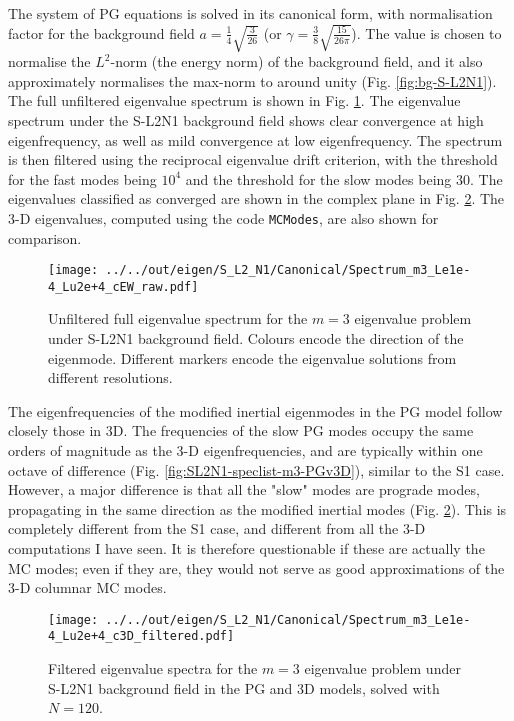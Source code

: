 The system of PG equations is solved in its canonical form, with normalisation factor for the background field $a = \frac{1}{4} \sqrt{\frac{3}{26}}$ (or $\gamma = \frac{3}{8} \sqrt{\frac{15}{26\pi}}$). The value is chosen to normalise the $L^2$-norm (the energy norm) of the background field, and it also approximately normalises the max-norm to around unity (Fig. \ref{fig:bg-S-L2N1}). The full unfiltered eigenvalue spectrum is shown in Fig. \ref{fig:SL2N1-spectrum-m3}. 
The eigenvalue spectrum under the S-L2N1 background field shows clear convergence at high eigenfrequency, as well as mild convergence at low eigenfrequency. The spectrum is then filtered using the reciprocal eigenvalue drift criterion, with the threshold for the fast modes being $10^4$ and the threshold for the slow modes being $30$. The eigenvalues classified as converged are shown in the complex plane in Fig. \ref{fig:SL2N1-spectrum-m3-PGv3D}. The 3-D eigenvalues, computed using the code \colorbox{backcolour}{\lstinline{MCModes}}, are also shown for comparison. 
%
\begin{figure}[htbp]
    \centering
    \texttt{[image: ../../out/eigen/S\_L2\_N1/Canonical/Spectrum\_m3\_Le1e-4\_Lu2e+4\_cEW\_raw.pdf]}
    \caption{Unfiltered full eigenvalue spectrum for the $m=3$ eigenvalue problem under S-L2N1 background field. Colours encode the direction of the eigenmode. Different markers encode the eigenvalue solutions from different resolutions.}
    \label{fig:SL2N1-spectrum-m3}
\end{figure}
%
The eigenfrequencies of the modified inertial eigenmodes in the PG model follow closely those in 3D. The frequencies of the slow PG modes occupy the same orders of magnitude as the 3-D eigenfrequencies, and are typically within one octave of difference (Fig. \ref{fig:SL2N1-speclist-m3-PGv3D}), similar to the S1 case. However, a major difference is that all the "slow" modes are prograde modes, propagating in the same direction as the modified inertial modes (Fig. \ref{fig:SL2N1-spectrum-m3-PGv3D}). This is completely different from the S1 case, and different from all the 3-D computations I have seen. It is therefore questionable if these are actually the MC modes; even if they are, they would not serve as good approximations of the 3-D columnar MC modes.
%
\begin{figure}[htbp]
    \centering
    \texttt{[image: ../../out/eigen/S\_L2\_N1/Canonical/Spectrum\_m3\_Le1e-4\_Lu2e+4\_c3D\_filtered.pdf]}
    \caption{Filtered eigenvalue spectra for the $m=3$ eigenvalue problem under S-L2N1 background field in the PG and 3D models, solved with $N=120$.}
    \label{fig:SL2N1-spectrum-m3-PGv3D}
\end{figure}
